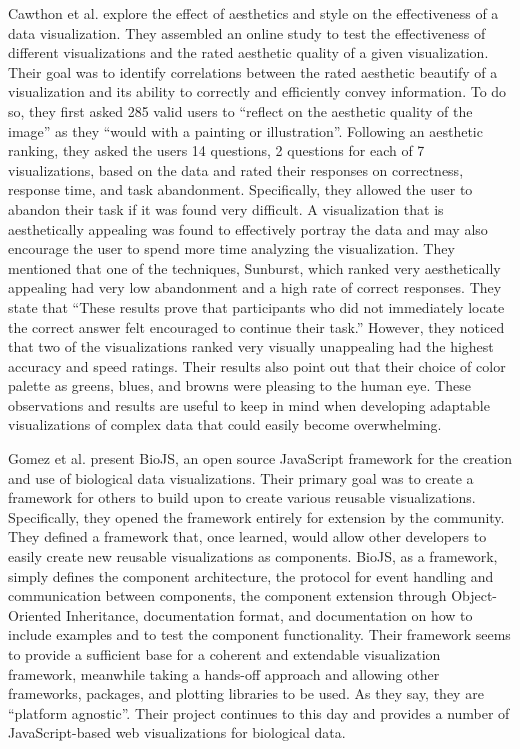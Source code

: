 Cawthon et al. \cite{aesthetic} explore the effect of aesthetics and style on the effectiveness of a data visualization.  They assembled an online study to test the effectiveness of different visualizations and the rated aesthetic quality of a given visualization.  Their goal was to identify correlations between the rated aesthetic beautify of a visualization and its ability to correctly and efficiently convey information.  To do so, they first asked 285 valid users to “reflect on the aesthetic quality of the image” as they “would with a painting or illustration”.  Following an aesthetic ranking, they asked the users 14 questions, 2 questions for each of 7 visualizations, based on the data and rated their responses on correctness, response time, and task abandonment.  Specifically, they allowed the user to abandon their task if it was found very difficult.  A visualization that is aesthetically appealing was found to effectively portray the data and may also encourage the user to spend more time analyzing the visualization.  They mentioned that one of the techniques, Sunburst, which ranked very aesthetically appealing had very low abandonment and a high rate of correct responses.  They state that “These results prove that participants who did not immediately locate the correct answer felt encouraged to continue their task.”  However, they noticed that two of the visualizations ranked very visually unappealing had the highest accuracy and speed ratings.  Their results also point out that their choice of color palette as greens, blues, and browns were pleasing to the human eye.  These observations and results are useful to keep in mind when developing adaptable visualizations of complex data that could easily become overwhelming. \par
Gomez et al. \cite{biojs} present BioJS, an open source JavaScript framework for the creation and use of biological data visualizations.  Their primary goal was to create a framework for others to build upon to create various reusable visualizations.  Specifically, they opened the framework entirely for extension by the community.  They defined a framework that, once learned, would allow other developers to easily create new reusable visualizations as components.  BioJS, as a framework, simply defines the component architecture, the protocol for event handling and communication between components, the component extension through Object-Oriented Inheritance, documentation format, and documentation on how to include examples and to test the component functionality.  Their framework seems to provide a sufficient base for a coherent and extendable visualization framework, meanwhile taking a hands-off approach and allowing other frameworks, packages, and plotting libraries to be used.  As they say, they are “platform agnostic”.  Their project continues to this day and provides a number of JavaScript-based web visualizations for biological data. \par
